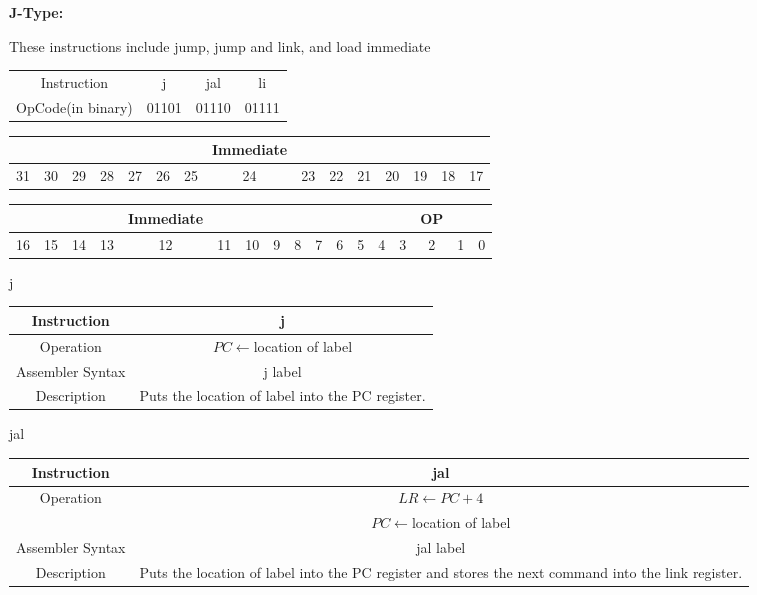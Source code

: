 \documentclass[]{article}
\begin{document}
\pagebreak

{\Large
	\textbf{
		J-Type:
	}
}

\noindent These instructions include jump, jump and link, and load immediate

\begin{center}
	\begin{tabular}{|c|c|c|c|}\cline{1-4}
	Instruction & j & jal & li \\\cline{1-4}\hfill
	OpCode(in binary) & 01101 & 01110 & 01111 \\\cline{1-4}
	\end{tabular}\vspace{1.5cm}
\end{center}
\begin{tabular}{|ccccccccccccccc|}\hline
  &  &  &  &  &  &  & Immediate & &  &  &  & &  &\\\hline
31&30&29&28&27&26&25&24&23&22&21&20&19&18&17\\\hline
\end{tabular}

\begin{tabular}{|cccccccccccc|ccccc|}\hline
	&  & & & Immediate &  & & & & & & & & & OP & & \\\hline
16&15&14&13&12&11&10&9&8&7&6&5&4&3&2&1&0\\\hline
\end{tabular}
\vspace{5mm}

j\\
\begin{tabularx}{\textwidth}{c|c}\hline
	Instruction & j\\\hline
	Operation & $PC \leftarrow $location of label\\\hline
	Assembler Syntax & j label\\\hline
	Description & Puts the location of label into the PC register.\\\hline
\end{tabularx}\vspace{1.5cm}

jal\\
\begin{tabularx}{\textwidth}{c|c}\hline
	Instruction & jal\\\hline
	Operation & $LR \leftarrow PC + 4$\\&$PC \leftarrow $location of label\\\hline
	Assembler Syntax & jal label\\\hline
	Description & Puts the location of label into the PC register and stores the next command into the link register.\\\hline
\end{tabularx}\vspace{1.5cm}
\end{document}

